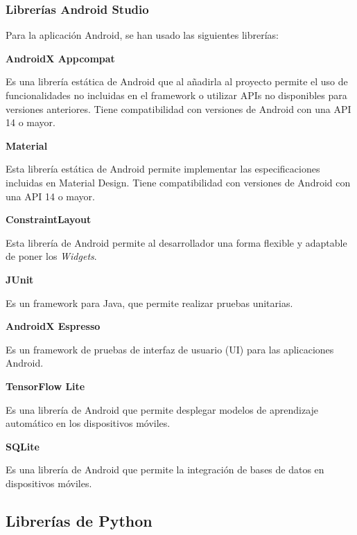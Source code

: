         \subsubsection{Librerías Android Studio}
        \hfill \break
            Para la aplicación Android, se han usado las siguientes librerías:
            \hfill \break
            
            \textbf{AndroidX Appcompat}
            
                Es una librería estática de Android que al añadirla al proyecto permite el uso de funcionalidades no incluidas en el framework o utilizar APIs no disponibles para versiones anteriores. Tiene compatibilidad con versiones de Android con una API 14 o mayor.
        
            \textbf{Material}
            
                Esta librería estática de Android permite implementar las especificaciones incluidas en Material Design. Tiene compatibilidad con versiones de Android con una API 14 o mayor.
                
            \textbf{ConstraintLayout}
            
                Esta librería de Android permite al desarrollador una forma flexible y adaptable de poner los \textit{Widgets}.
        
            \textbf{JUnit}
            
                Es un framework para Java, que permite realizar pruebas unitarias.
                
            \textbf{AndroidX Espresso}
            
                Es un framework de pruebas de interfaz de usuario (UI) para las aplicaciones Android.
                
            \textbf{TensorFlow Lite}
            
                Es una librería de Android que permite desplegar modelos de aprendizaje automático en los dispositivos móviles.
            
            \textbf{SQLite}
            
                Es una librería de Android que permite la integración de bases de datos en dispositivos móviles.
                
    \subsection{Librerías de Python}
    
